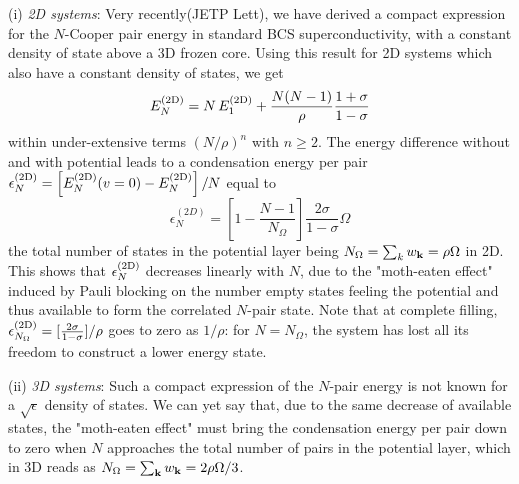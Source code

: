 \documentclass[5p,twocolumn]{elsarticle}
\begin{document}
(i) {\it 2D systems}: Very recently(JETP Lett), we have derived a compact expression for the $N$-Cooper pair energy in standard BCS superconductivity, with a constant density of state above a 3D frozen core. Using this result  for 2D systems which also have a constant density of states, we get
\begin{equation}\label{eq:E2dN}
 E^{{\text{(2D)}}}_N=N\,E^{{\text{(2D)}}}_1+\frac{N(N-1)}{\rho}\frac{1+\sigma}{1-\sigma}
\end{equation}
within under-extensive terms $(N/\rho)^n$ with $n\geqslant2$.
The energy difference without and with potential
leads to a condensation energy per pair $\epsilon_N^{{\text{(2D)}}} = \left[E_N^{{{\text{(2D)}}}}(v=0)-E_N^{{\text{(2D)}}}\right]/N$ equal to
  \begin{equation}
\epsilon^{(2D)}_N=\left[1-\frac{N-1}{N_\Omega}\right]\frac{2\sigma}{1-\sigma}\Omega\label{eq:E2D}
\end{equation}
 the total number of states in the potential layer being $N_\Omega=\sum_k{}w_{\mathbf{k}}=\rho\Omega$ in 2D. This shows that $\epsilon^{{\text{(2D)}}}_N$  decreases linearly with $N$, due to the "moth-eaten effect" induced by Pauli blocking on the number empty states feeling the potential and thus available to form the correlated $N$-pair state.  Note that at complete filling, $
\epsilon^{{\text{(2D)}}}_{N_\Omega}=[\frac{2\sigma}{1-\sigma}]/\rho$ goes to zero as $1/\rho$: for $N=N_\Omega$, the system has lost all its freedom to construct a lower energy state.






(ii) {\it 3D systems}: Such a compact expression of the $N$-pair energy is not known for a $\sqrt{\epsilon}$ density of states. We can yet say that, due to the same decrease of available states, the "moth-eaten effect" must bring the condensation energy per pair down to zero when $N$ approaches the total number of pairs in the potential layer, which in 3D reads as $N_\Omega=\sum_{\mathbf{k}}w_{\mathbf{k}}=2\rho \Omega/3$. 
\end{document}
